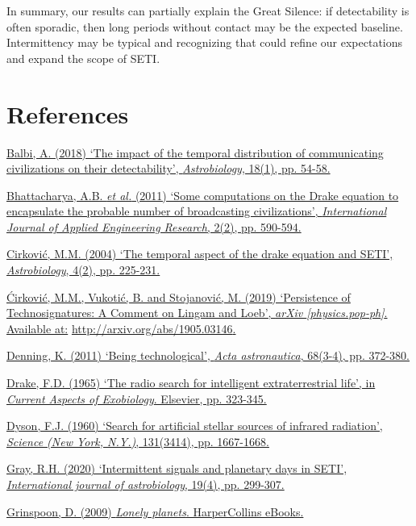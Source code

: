 In summary, our results can partially explain the Great Silence: if detectability is often sporadic, then long periods without contact may be the expected baseline. Intermittency may be typical and recognizing that could refine our expectations and expand the scope of SETI.

\section{References}\label{references}

\href{http://paperpile.com/b/hQuIW4/X9R2}{Balbi, A. (2018) `The impact of the temporal distribution of communicating civilizations on their detectability', \emph{Astrobiology}, 18(1), pp. 54-58.}

\href{http://paperpile.com/b/hQuIW4/FH2j}{Bhattacharya, A.B. \emph{et al.} (2011) `Some computations on the Drake equation to encapsulate the probable number of broadcasting civilizations', \emph{International Journal of Applied Engineering Research}, 2(2), pp. 590-594.}

\href{http://paperpile.com/b/hQuIW4/IJ88}{Cirković, M.M. (2004) `The temporal aspect of the drake equation and SETI', \emph{Astrobiology}, 4(2), pp. 225-231.}

\href{http://paperpile.com/b/hQuIW4/4VUA}{Ćirković, M.M., Vukotić, B. and Stojanović, M. (2019) `Persistence of Technosignatures: A Comment on Lingam and Loeb', \emph{arXiv {[}physics.pop-ph{]}}. Available at:} \url{http://arxiv.org/abs/1905.03146}\href{http://paperpile.com/b/hQuIW4/4VUA}{.}

\href{http://paperpile.com/b/hQuIW4/i0of}{Denning, K. (2011) `Being technological', \emph{Acta astronautica}, 68(3-4), pp. 372-380.}

\href{http://paperpile.com/b/hQuIW4/Ed2x}{Drake, F.D. (1965) `The radio search for intelligent extraterrestrial life', in \emph{Current Aspects of Exobiology}. Elsevier, pp. 323-345.}

\href{http://paperpile.com/b/hQuIW4/l4IB}{Dyson, F.J. (1960) `Search for artificial stellar sources of infrared radiation', \emph{Science (New York, N.Y.)}, 131(3414), pp. 1667-1668.}

\href{http://paperpile.com/b/hQuIW4/ayaR}{Gray, R.H. (2020) `Intermittent signals and planetary days in SETI', \emph{International journal of astrobiology}, 19(4), pp. 299-307.}

\href{http://paperpile.com/b/hQuIW4/dG8s}{Grinspoon, D. (2009) \emph{Lonely planets}. HarperCollins eBooks.}

